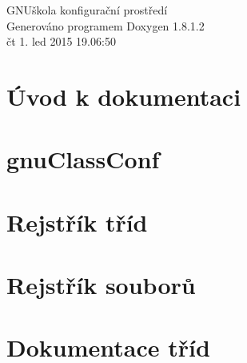 \documentclass{book}
\begin{document}
\hypersetup{pageanchor=false,citecolor=blue}
\begin{titlepage}
\vspace*{7cm}
\begin{center}
{\Large G\-N\-Uškola konfigurační prostředí }\\
\vspace*{1cm}
{\large Generováno programem Doxygen 1.8.1.2}\\
\vspace*{0.5cm}
{\small čt 1. led 2015 19.06:50}\\
\end{center}
\end{titlepage}
\clearemptydoublepage
{}
\tableofcontents
\clearemptydoublepage
{}
\hypersetup{pageanchor=true,citecolor=blue}
\chapter{Úvod k dokumentaci}
\label{index}\hypertarget{index}{}
\chapter{gnu\-Class\-Conf}
\label{md_README}
\hypertarget{md_README}{}

\chapter{Rejstřík tříd}

\chapter{Rejstřík souborů}

\chapter{Dokumentace tříd}



































\end{document}
